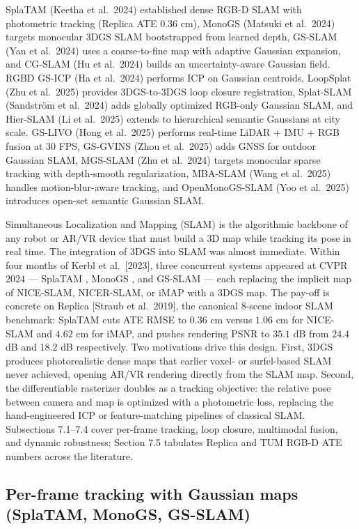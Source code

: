 \documentclass{article}
\begin{document}
SplaTAM (Keetha et al.~2024) established dense RGB-D SLAM with photometric tracking (Replica ATE \(0.36\) cm), MonoGS (Matsuki et al.~2024) targets monocular 3DGS SLAM bootstrapped from learned depth, GS-SLAM (Yan et al.~2024) uses a coarse-to-fine map with adaptive Gaussian expansion, and CG-SLAM (Hu et al.~2024) builds an uncertainty-aware Gaussian field. RGBD GS-ICP (Ha et al.~2024) performs ICP on Gaussian centroids, LoopSplat (Zhu et al.~2025) provides 3DGS-to-3DGS loop closure registration, Splat-SLAM (Sandström et al.~2024) adds globally optimized RGB-only Gaussian SLAM, and Hier-SLAM (Li et al.~2025) extends to hierarchical semantic Gaussians at city scale. GS-LIVO (Hong et al.~2025) performs real-time LiDAR + IMU + RGB fusion at \(30\) FPS, GS-GVINS (Zhou et al.~2025) adds GNSS for outdoor Gaussian SLAM, MGS-SLAM (Zhu et al.~2024) targets monocular sparse tracking with depth-smooth regularization, MBA-SLAM (Wang et al.~2025) handles motion-blur-aware tracking, and OpenMonoGS-SLAM (Yoo et al.~2025) introduces open-set semantic Gaussian SLAM.

Simultaneous Localization and Mapping (SLAM) is the algorithmic backbone of any robot or AR/VR device that must build a 3D map while tracking its pose in real time. The integration of 3DGS into SLAM was almost immediate. Within four months of Kerbl et al.~{[}2023{]}, three concurrent systems appeared at CVPR \(2024\) --- SplaTAM \cite{keetha2024splatamsplattracka}, MonoGS \cite{matsuki2024gaussiansplattings}, and GS-SLAM \cite{yan2024multiscale3dgaussi} --- each replacing the implicit map of NICE-SLAM, NICER-SLAM, or iMAP with a 3DGS map. The pay-off is concrete on Replica {[}Straub et al.~2019{]}, the canonical 8-scene indoor SLAM benchmark: SplaTAM cuts ATE RMSE to \(0.36\) cm versus \(1.06\) cm for NICE-SLAM and \(4.62\) cm for iMAP, and pushes rendering PSNR to \(35.1\) dB from \(24.4\) dB and \(18.2\) dB respectively. Two motivations drive this design. First, 3DGS produces photorealistic dense maps that earlier voxel- or surfel-based SLAM never achieved, opening AR/VR rendering directly from the SLAM map. Second, the differentiable rasterizer doubles as a tracking objective: the relative pose between camera and map is optimized with a photometric loss, replacing the hand-engineered ICP or feature-matching pipelines of classical SLAM. Subsections 7.1--7.4 cover per-frame tracking, loop closure, multimodal fusion, and dynamic robustness; Section 7.5 tabulates Replica and TUM RGB-D ATE numbers across the literature.

\subsection{Per-frame tracking with Gaussian maps (SplaTAM, MonoGS, GS-SLAM)}\label{per-frame-tracking-with-gaussian-maps-splatam-monogs-gs-slam}
\end{document}
